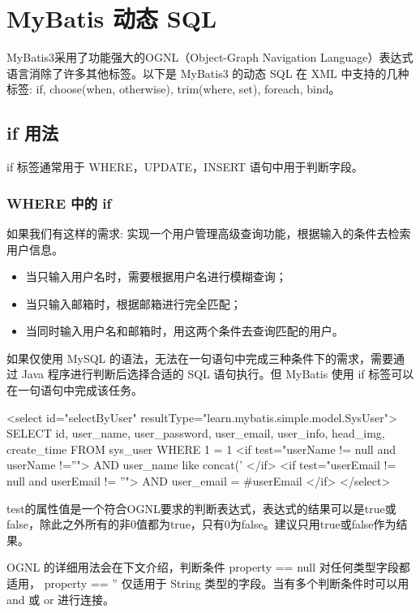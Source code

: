 \section{MyBatis 动态 SQL}

MyBatis3采用了功能强大的OGNL（Object-Graph Navigation Language）表达式语言消除了许多其他标签。以下是 MyBatis3 的动态 SQL 在 XML 中支持的几种标签: if, choose(when, otherwise), trim(where, set), foreach, bind。

\subsection{if 用法}

if 标签通常用于 WHERE，UPDATE，INSERT 语句中用于判断字段。

\subsubsection*{WHERE 中的 if}

如果我们有这样的需求: 实现一个用户管理高级查询功能，根据输入的条件去检索用户信息。
\begin{itemize}
    \item 当只输入用户名时，需要根据用户名进行模糊查询；
    \item 当只输入邮箱时，根据邮箱进行完全匹配；
    \item 当同时输入用户名和邮箱时，用这两个条件去查询匹配的用户。
\end{itemize}

如果仅使用 MySQL 的语法，无法在一句语句中完成三种条件下的需求，需要通过 Java 程序进行判断后选择合适的 SQL 语句执行。但 MyBatis 使用 if 标签可以在一句语句中完成该任务。

\begin{xml}
<select id="selectByUser" resultType="learn.mybatis.simple.model.SysUser">
    SELECT id, user_name, user_password, user_email, user_info, head_img, create_time
    FROM sys_user
    WHERE 1 = 1
    <if test="userName != null and userName !=''">
        AND user_name like concat('%
    </if>
    <if test="userEmail != null and userEmail != ''">
        AND user_email = #{userEmail}
    </if>
</select>
\end{xml}

test的属性值是一个符合OGNL要求的判断表达式，表达式的结果可以是true或false，除此之外所有的非0值都为true，只有0为false。建议只用true或false作为结果。

OGNL 的详细用法会在下文介绍，判断条件 property == null 对任何类型字段都适用， property == '' 仅适用于 String 类型的字段。当有多个判断条件时可以用 and 或 or 进行连接。

